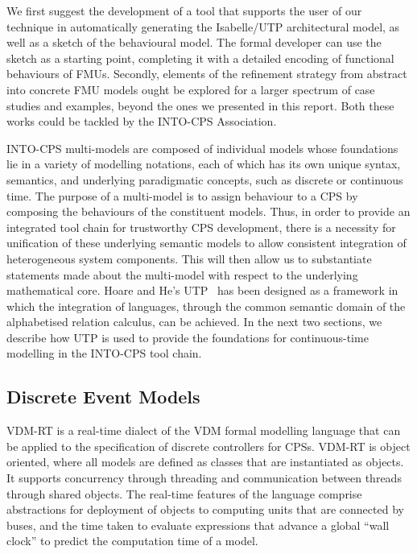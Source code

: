 We first suggest the development of a tool that supports the user of our technique in automatically generating the Isabelle/UTP architectural model, as well as a sketch of the behavioural model. The formal developer can use the sketch as a starting point, completing it with a detailed encoding of functional behaviours of FMUs. Secondly, elements of the refinement strategy from abstract into concrete FMU models ought be explored for a larger spectrum of case studies and examples, beyond the ones we presented in this report. Both these works could be tackled by the INTO-CPS Association.

INTO-CPS multi-models are composed of individual models whose foundations lie in a variety of modelling notations, each of which has its own unique syntax, semantics, and underlying paradigmatic concepts, such as discrete or continuous time.  The purpose of a multi-model is to assign behaviour to a CPS by composing the behaviours of the constituent models.  Thus, in order to provide an integrated tool chain for trustworthy CPS development, there is a necessity for unification of these underlying semantic models to allow consistent integration of heterogeneous system components.  This will then allow us to substantiate statements made about the multi-model with respect to the underlying mathematical core.  Hoare and He's UTP~\cite{Hoare&98} has been designed as a framework in which the integration of languages, through the common semantic domain of the alphabetised relation calculus, can be achieved.  In the next two sections, we describe how UTP is used to provide the foundations for continuous-time modelling in the INTO-CPS tool chain.

\subsection{Discrete Event Models}

VDM-RT is a real-time dialect of the VDM formal modelling language that can be applied to the specification of discrete controllers for CPSs.  VDM-RT is object oriented, where all models are defined as classes that are instantiated as objects.  It supports concurrency through threading and communication between threads through shared objects.  The real-time features of the language comprise abstractions for deployment of objects to computing units that are connected by buses, and the time taken to evaluate expressions that advance a global ``wall clock'' to predict the computation time of a model.

